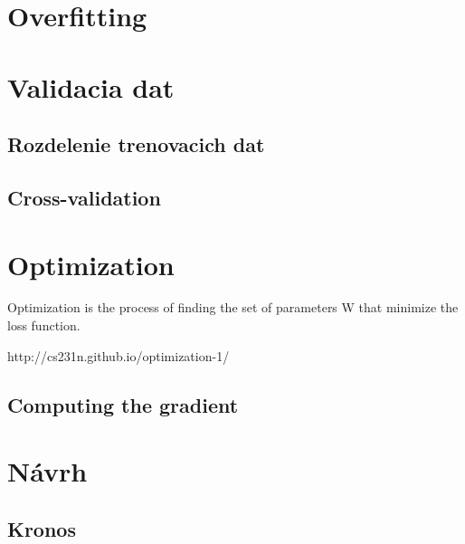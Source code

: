 \documentclass[10pt,a4paper]{article}
\begin{document}
\section{Overfitting}




\section{Validacia dat}

\subsection{Rozdelenie trenovacich dat}

\subsection{Cross-validation}



\section{Optimization}
Optimization is the process of finding the set of parameters W that minimize the loss function.

http://cs231n.github.io/optimization-1/

\subsection{Computing the gradient}





\section{Návrh}

\subsection{Kronos}
\end{document}
